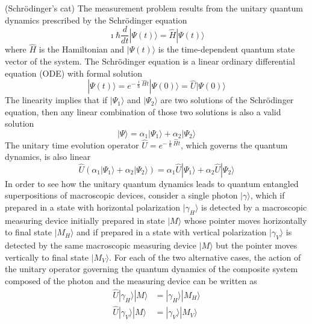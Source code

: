 \documentclass{ws-ijmpb}
\begin{document}
\begin{example}
(Schr\"{o}dinger's cat) The measurement problem results from the unitary
quantum dynamics prescribed by the Schr\"{o}dinger equation
\begin{equation}
\imath\hbar\frac{d}{dt}|\Psi(t)\rangle=\hat{H}|\Psi(t)\rangle
\end{equation}
where $\hat{H}$ is the Hamiltonian and $|\Psi(t)\rangle$ is the
time-dependent quantum state vector of the system. The Schr\"{o}dinger equation is a linear
ordinary differential equation (ODE) with formal solution
\begin{equation}
|\Psi(t)\rangle=e^{-\frac{\imath}{\hbar}\hat{H}t}|\Psi(0)\rangle=\hat{U}|\Psi(0)\rangle
\end{equation}
The linearity implies that if $|\Psi_{1}\rangle$ and $|\Psi_{2}\rangle$
are two solutions of the Schr\"{o}dinger equation, then any linear combination
of those two solutions is also a valid solution
\begin{equation}
|\Psi\rangle=\alpha_{1}|\Psi_{1}\rangle+\alpha_{2}|\Psi_{2}\rangle
\end{equation}
The unitary time evolution operator $\hat{U}=e^{-\frac{\imath}{\hbar}\hat{H}t}$,
which governs the quantum dynamics, is also linear 
\begin{equation}
\hat{U}\left(\alpha_{1}|\Psi_{1}\rangle+\alpha_{2}|\Psi_{2}\rangle\right)=\alpha_{1}\hat{U}|\Psi_{1}\rangle+\alpha_{2}\hat{U}|\Psi_{2}\rangle
\end{equation}
In order to see how the unitary quantum dynamics leads to quantum
entangled superpositions of macroscopic devices, consider a single
photon $|\gamma\rangle$, which if prepared in a state with horizontal
polarization $|\gamma_{H}\rangle$ is detected by a macroscopic measuring
device initially prepared in state $|M\rangle$ whose pointer moves horizontally to final state $|M_{H}\rangle$
and if prepared in a state with vertical polarization $|\gamma_{V}\rangle$
is detected by the same macroscopic measuring device $|M\rangle$
but the pointer moves vertically to final state $|M_{V}\rangle$. For each of the
two alternative cases, the action of the unitary operator governing
the quantum dynamics of the composite system composed of the photon
and the measuring device can be written as
\begin{align}
\hat{U}|\gamma_{H}\rangle|M\rangle & =|\gamma_{H}\rangle|M_{H}\rangle\\
\hat{U}|\gamma_{V}\rangle|M\rangle & =|\gamma_{V}\rangle|M_{V}\rangle
\end{align}

\end{example}
\end{document}
